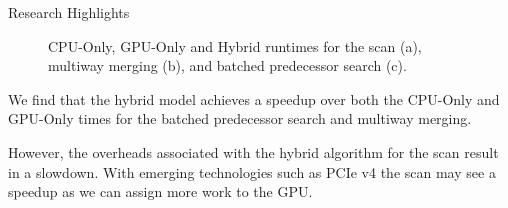 \documentclass[final]{beamer}
\newlength{\colwidth}
\begin{document}
\begin{frame}[t]
\begin{columns}[t]
\begin{column}{\colwidth}
\begin{block}{Research Highlights}
 \begin{figure}[htp]
\centering
{}
   \caption{CPU-Only, GPU-Only and Hybrid runtimes for the scan (a), multiway merging (b), and batched predecessor search (c).}
   \label{fig:predecessor_search_results}
\end{figure}

\end{block} 
\begin{description}[font=$\bullet$~\normalfont\scshape\color{red!50!black}]
\item We find that the hybrid model achieves a speedup over both the CPU-Only and GPU-Only times for the batched predecessor search and multiway merging. 
\item However, the overheads associated with the hybrid algorithm for the scan result in a slowdown. With emerging technologies such as PCIe v4 the scan may see
  a speedup as we can assign more work to the GPU.
\end{description}



\end{column}
\end{columns}
\end{frame}
\end{document}
